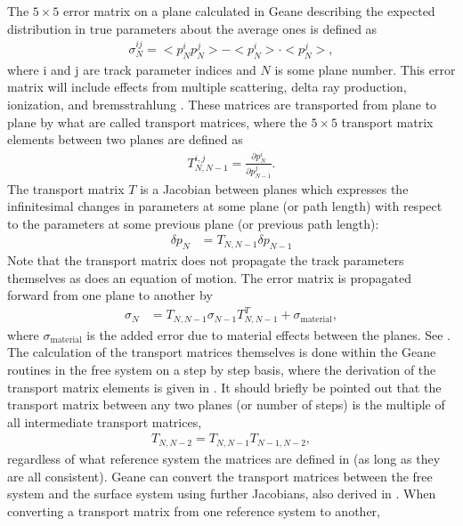 The $5 \times 5$ error matrix on a plane calculated in Geane describing the expected distribution in true parameters about the average ones is defined as
    \begin{align} \label{eq:errormatrix}
        \sigma_{N}^{ij} = <p_{N}^{i}p_{N}^{j}> - <p_{N}^{i}> \cdot <p_{N}^{j}>,
    \end{align} 
where i and j are track parameter indices and $N$ is some plane number. This error matrix will include effects from multiple scattering, delta ray production, ionization, and bremsstrahlung \cite{geanemanual,Lavezzi,energyloss}. These matrices are transported from plane to plane by what are called transport matrices, where the $5 \times 5$ transport matrix elements between two planes are defined as 
    \begin{align} \label{eq:transportmatrix}
        T_{N,N-1}^{i,j} = \frac{\partial p^{i}_{N}}{\partial p^{j}_{N-1}}.
    \end{align}
The transport matrix $T$ is a Jacobian between planes which expresses the infinitesimal changes in parameters at some plane (or path length) with respect to the parameters at some previous plane (or previous path length):
    \begin{align} \label{eq:parametertransport}
        \delta p_{N} &= T_{N,N-1} \delta p_{N-1}
    \end{align}
Note that the transport matrix does not propagate the track parameters themselves as does an equation of motion. The error matrix is propagated forward from one plane to another by
    \begin{align} \label{eq:errortransport}
        \sigma_{N} &= T_{N,N-1} \sigma_{N-1} T_{N,N-1}^{T} + \sigma_{\text{material}},
    \end{align}
where $\sigma_{\text{material}}$ is the added error due to material effects between the planes. See . The calculation of the transport matrices themselves is done within the Geane routines in the free system on a step by step basis, where the derivation of the transport matrix elements is given in . It should briefly be pointed out that the transport matrix between any two planes (or number of steps) is the multiple of all intermediate transport matrices,
    \begin{align}
        T_{N,N-2} = T_{N,N-1} T_{N-1,N-2},
    \end{align}
regardless of what reference system the matrices are defined in (as long as they are all consistent). Geane can convert the transport matrices between the free system and the surface system using further Jacobians, also derived in . When converting a transport matrix from one reference system to another,
